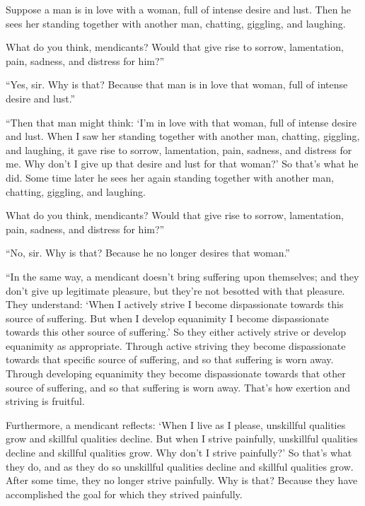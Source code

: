 \documentclass[12pt,openany]{book}%
\begin{document}
Suppose a man is in love with a woman, full of intense desire and lust. Then he sees her standing together with another man, chatting, giggling, and laughing. 

What do you think, mendicants? Would that give rise to sorrow, lamentation, pain, sadness, and distress for him?” 

“Yes, sir. Why is that? Because that man is in love that woman, full of intense desire and lust.” 

“Then that man might think: ‘I’m in love with that woman, full of intense desire and lust. When I saw her standing together with another man, chatting, giggling, and laughing, it gave rise to sorrow, lamentation, pain, sadness, and distress for me. Why don’t I give up that desire and lust for that woman?’ So that’s what he did. Some time later he sees her again standing together with another man, chatting, giggling, and laughing. 

What do you think, mendicants? Would that give rise to sorrow, lamentation, pain, sadness, and distress for him?” 

“No, sir. Why is that? Because he no longer desires that woman.” 

“In the same way, a mendicant doesn’t bring suffering upon themselves; and they don’t give up legitimate pleasure, but they’re not besotted with that pleasure. They understand: ‘When I actively strive I become dispassionate towards this source of suffering. But when I develop equanimity I become dispassionate towards this other source of suffering.’ So they either actively strive or develop equanimity as appropriate. Through active striving they become dispassionate towards that specific source of suffering, and so that suffering is worn away. Through developing equanimity they become dispassionate towards that other source of suffering, and so that suffering is worn away. That’s how exertion and striving is fruitful. 

Furthermore, a mendicant reflects: ‘When I live as I please, unskillful qualities grow and skillful qualities decline. But when I strive painfully, unskillful qualities decline and skillful qualities grow. Why don’t I strive painfully?’ So that’s what they do, and as they do so unskillful qualities decline and skillful qualities grow. After some time, they no longer strive painfully. Why is that? Because they have accomplished the goal for which they strived painfully. 
\end{document}
